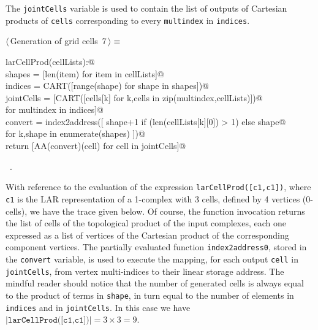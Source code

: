 \documentclass[11pt,oneside]{article}	%
\begin{document}
The \texttt{jointCells} variable is used to contain the list of outputs of Cartesian products of \texttt{cells} corresponding to every \texttt{multindex} in \texttt{indices}.

\begin{flushleft} \small \label{scrap9}
\protect{}$\langle\,$Generation of grid cells\nobreak\ {\footnotesize 7}$\,\rangle\equiv$
\vspace{-1ex}
\begin{list}{}{} \item
\mbox{}\verb@def larCellProd(cellLists):@\\
\mbox{}\verb@    shapes = [len(item) for item in cellLists]@\\
\mbox{}\verb@    indices = CART([range(shape) for shape in shapes])@\\
\mbox{}\verb@    jointCells = [CART([cells[k] for k,cells in zip(multindex,cellLists)])@\\
\mbox{}\verb@                  for multindex in indices]@\\
\mbox{}\verb@    convert = index2address([ shape+1 if (len(cellLists[k][0]) > 1) else shape@\\
\mbox{}\verb@                             for k,shape in enumerate(shapes) ])@\\
\mbox{}\verb@    return [AA(convert)(cell) for cell in jointCells]@\\
\mbox{}\verb@@{\NWsep}
\end{list}
\vspace{-1ex}
\footnotesize\addtolength{\baselineskip}{-1ex}
\begin{list}{}{\setlength{\itemsep}{-\parsep}\setlength{\itemindent}{-\leftmargin}}
\item \NWtxtMacroRefIn\ .
\end{list}
\end{flushleft}

With reference to the evaluation of the expression \texttt{larCellProd([c1,c1])}, where \texttt{c1} is the LAR representation of a 1-complex with 3 cells, defined by 4 vertices (0-cells), we have the  trace given below.
Of course, the function invocation returns the list of cells of the topological product of the input complexes, each one expressed as a list of vertices of the Cartesian product of the corresponding component vertices. The partially evaluated function \texttt{index2address0}, stored in the \texttt{convert} variable, is used to execute the mapping, for each output \texttt{cell} in \texttt{jointCells}, from vertex multi-indices to their linear storage address. The mindful reader should notice that the number of generated cells is always equal to the product of terms in \texttt{shape}, in turn equal to the number of elements in \texttt{indices} and in \texttt{jointCells}. In this case we have $|\texttt{larCellProd([c1,c1])}| = 3\times 3=9$.
\end{document}
